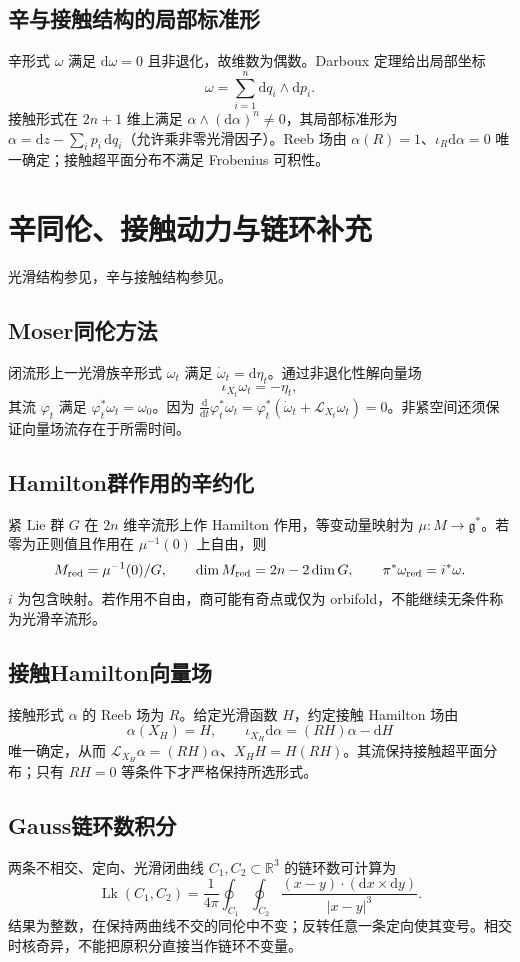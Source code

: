 \documentclass[../main.tex]{subfiles}
\begin{document}
\subsection{辛与接触结构的局部标准形}
辛形式 $\omega$ 满足 $\mathrm d\omega=0$ 且非退化，故维数为偶数。Darboux 定理给出局部坐标
\[
\omega=\sum_{i=1}^n\mathrm dq_i\wedge\mathrm dp_i.
\]
接触形式在 $2n+1$ 维上满足 $\alpha\wedge(\mathrm d\alpha)^n\ne0$，其局部标准形为 $\alpha=\mathrm dz-\sum_i p_i\,\mathrm dq_i$（允许乘非零光滑因子）。Reeb 场由 $\alpha(R)=1$、$\iota_R\mathrm d\alpha=0$ 唯一确定；接触超平面分布不满足 Frobenius 可积性。

\section{辛同伦、接触动力与链环补充}
光滑结构参见\cite{lee,hatcher}，辛与接触结构参见\cite{symplectic}。
\subsection{Moser同伦方法}
闭流形上一光滑族辛形式 $\omega_t$ 满足 $\dot\omega_t=\mathrm d\eta_t$。通过非退化性解向量场
\[
\iota_{X_t}\omega_t=-\eta_t,
\]
其流 $\varphi_t$ 满足 $\varphi_t^*\omega_t=\omega_0$。因为 $\frac{\mathrm d}{\mathrm dt}\varphi_t^*\omega_t=\varphi_t^*(\dot\omega_t+\mathcal L_{X_t}\omega_t)=0$。非紧空间还须保证向量场流存在于所需时间。
\subsection{Hamilton群作用的辛约化}
紧 Lie 群 $G$ 在 $2n$ 维辛流形上作 Hamilton 作用，等变动量映射为 $\mu:M\to\mathfrak g^*$。若零为正则值且作用在 $\mu^{-1}(0)$ 上自由，则
\[
M_{\rm red}=\mu^{-1}(0)/G,\qquad
\dim M_{\rm red}=2n-2\dim G,\qquad
\pi^*\omega_{\rm red}=i^*\omega.
\]
$i$ 为包含映射。若作用不自由，商可能有奇点或仅为 orbifold，不能继续无条件称为光滑辛流形。
\subsection{接触Hamilton向量场}
接触形式 $\alpha$ 的 Reeb 场为 $R$。给定光滑函数 $H$，约定接触 Hamilton 场由
\[
\alpha(X_H)=H,\qquad
\iota_{X_H}\mathrm d\alpha=(RH)\alpha-\mathrm dH
\]
唯一确定，从而 $\mathcal L_{X_H}\alpha=(RH)\alpha$、$X_HH=H(RH)$。其流保持接触超平面分布；只有 $RH=0$ 等条件下才严格保持所选形式。
\subsection{Gauss链环数积分}
两条不相交、定向、光滑闭曲线 $C_1,C_2\subset\mathbb R^3$ 的链环数可计算为
\[
\operatorname{Lk}(C_1,C_2)=\frac1{4\pi}
\oint_{C_1}\oint_{C_2}
\frac{(x-y)\cdot(\mathrm dx\times\mathrm dy)}{|x-y|^3}.
\]
结果为整数，在保持两曲线不交的同伦中不变；反转任意一条定向使其变号。相交时核奇异，不能把原积分直接当作链环不变量。
\clearpage
\end{document}
